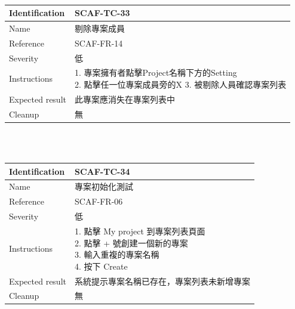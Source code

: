 \documentclass{report}
\begin{document}
\\
\begin{tabularx}{\textwidth}{
  |p{}%
  |p{}|%
  }
  \hline
  \centering Identification &  SCAF-TC-33 \\
  \hline
  \centering Name & 剔除專案成員 \\
  \hline
  \centering Reference & SCAF-FR-14 \\
  \hline
  \centering Severity & 低 \\
  \hline
  \centering Instructions & 
  \makecell[l]{
    1. 專案擁有者點擊Project名稱下方的Setting \\
    2. 點擊任一位專案成員旁的X
    3. 被剔除人員確認專案列表
  }\\
  \hline
  \centering Expected result & 此專案應消失在專案列表中 \\
  \hline
  \centering Cleanup & 無 \\
  \hline
\end{tabularx}
\\
\newline
\\
\begin{tabularx}{\textwidth}{
  |p{}%
  |p{}|%
  }
  \hline
  \centering Identification &  SCAF-TC-34 \\
  \hline
  \centering Name & 專案初始化測試 \\
  \hline
  \centering Reference & SCAF-FR-06 \\
  \hline
  \centering Severity & 低 \\
  \hline
  \centering Instructions & 
  \makecell[l]{
    1. 點擊 My project 到專案列表頁面 \\
    2. 點擊 + 號創建一個新的專案 \\
    3. 輸入重複的專案名稱 \\
    4. 按下 Create
  }\\
  \hline
  \centering Expected result & 系統提示專案名稱已存在，專案列表未新增專案 \\
  \hline
  \centering Cleanup & 無 \\
  \hline
\end{tabularx}
\\
\newline
\\
\end{document}
